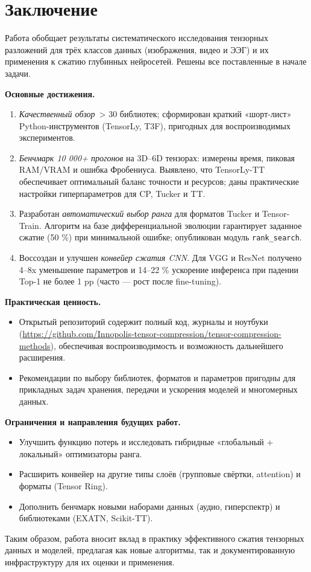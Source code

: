 \chapter{Заключение}
\label{chap:conclusion}

Работа обобщает результаты систематического исследования тензорных разложений для трёх классов данных (изображения, видео и ЭЭГ) и их применения к сжатию глубинных нейросетей. Решены все поставленные в начале задачи.

\textbf{Основные достижения.}
\begin{enumerate}\setlength\itemsep{0.3em}
    \item \emph{Качественный обзор} \,> 30 библиотек; сформирован краткий «шорт-лист» Python-инструментов (TensorLy, T3F), пригодных для воспроизводимых экспериментов.
    \item \emph{Бенчмарк 10 000+ прогонов} на 3D–6D тензорах: измерены время, пиковая RAM/VRAM и ошибка Фробениуса. Выявлено, что TensorLy-TT обеспечивает оптимальный баланс точности и ресурсов; даны практические настройки гиперпараметров для CP, Tucker и TT.
    \item Разработан \emph{автоматический выбор ранга} для форматов Tucker и Tensor-Train. Алгоритм на базе дифференциальной эволюции гарантирует заданное сжатие (50 \%) при минимальной ошибке; опубликован модуль \texttt{rank\_search}.
    \item Воссоздан и улучшен \emph{конвейер сжатия CNN}. Для VGG и ResNet получено 4–8x уменьшение параметров и 14–22 \% ускорение инференса при падении Top-1 не более 1 pp (часто — рост после fine-tuning).
\end{enumerate}

\textbf{Практическая ценность.}
\begin{itemize}\setlength\itemsep{0.25em}
    \item Открытый репозиторий содержит полный код, журналы и ноутбуки (\url{https://github.com/Innopolis-tensor-compression/tensor-compression-methods}), обеспечивая воспроизводимость и возможность дальнейшего расширения.
    \item Рекомендации по выбору библиотек, форматов и параметров пригодны для прикладных задач хранения, передачи и ускорения моделей и многомерных данных.
\end{itemize}

\textbf{Ограничения и направления будущих работ.}
\begin{itemize}\setlength\itemsep{0.25em}
    \item Улучшить функцию потерь и исследовать гибридные «глобальный + локальный» оптимизаторы ранга.
    \item Расширить конвейер на другие типы слоёв (групповые свёртки, attention) и форматы (Tensor Ring).
    \item Дополнить бенчмарк новыми наборами данных (аудио, гиперспектр) и библиотеками (EXATN, Scikit-TT).
\end{itemize}

Таким образом, работа вносит вклад в практику эффективного сжатия тензорных данных и моделей, предлагая как новые алгоритмы, так и документированную инфраструктуру для их оценки и применения.